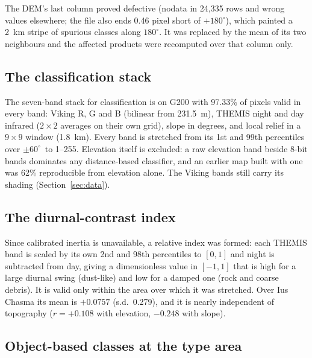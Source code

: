 \documentclass[twocolumn]{aastex701}
\newcommand{\pmsixty}{$\pm60^{\circ}$}
\begin{document}
The DEM's last column proved defective (nodata in 24,335 rows and wrong values elsewhere; the file also ends 0.46
pixel short of $+180^{\circ}$), which painted a 2~km stripe of spurious classes along $180^{\circ}$. It was replaced
by the mean of its two neighbours and the affected products were recomputed over that column only. %

\subsection{The classification stack}

The seven-band stack for classification is on G200 with 97.33\% of pixels valid in every band: Viking R, G and B
(bilinear from 231.5~m), THEMIS night and day infrared ($2\times2$ averages on their own grid), slope in degrees, and
local relief in a $9\times9$ window (1.8~km). Every band is stretched from its 1st and 99th percentiles over \pmsixty\
to 1--255. Elevation itself is excluded: a raw elevation band beside 8-bit bands dominates any distance-based classifier,
and an earlier map built with one was 62\% reproducible from elevation alone. The Viking bands still carry its
shading (Section~\ref{sec:data}). %

\subsection{The diurnal-contrast index}

Since calibrated inertia is unavailable, a relative index was formed: each THEMIS band is scaled by its own 2nd and
98th percentiles to $[0,1]$ and night is subtracted from day, giving a dimensionless value in $[-1,1]$ that is high for
a large diurnal swing (dust-like) and low for a damped one (rock and coarse debris). It is valid only within the area
over which it was stretched. Over Ius Chasma its mean is $+0.0757$ (s.d.\ 0.279), and it is nearly independent of
topography ($r=+0.108$ with elevation, $-0.248$ with slope). %

\subsection{Object-based classes at the type area} \label{sec:segments}
\end{document}
